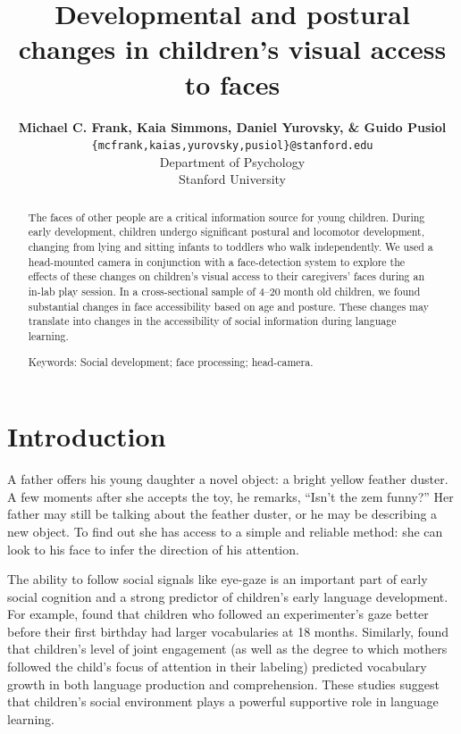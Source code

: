 \documentclass[10pt,letterpaper]{article}
\title{Developmental and postural changes in children's visual access to faces}
\author{{\large \bf Michael C. Frank, Kaia Simmons, Daniel Yurovsky, \& Guido Pusiol} \\
\texttt{\{mcfrank,kaias,yurovsky,pusiol\}@stanford.edu} \\
Department of Psychology \\
Stanford University}
\begin{document}
\maketitle

\begin{abstract} 

The faces of other people are a critical information source for young children. During early development, children undergo significant postural and locomotor development, changing from lying and sitting infants to toddlers who walk independently. We used a head-mounted camera in conjunction with a face-detection system to explore the effects of these changes on children's visual access to their caregivers' faces during an in-lab play session. In a cross-sectional sample of 4--20 month old children, we found substantial changes in face accessibility based on age and posture. These changes may translate into changes in the accessibility of social information during language learning. 

{Keywords:} Social development; face processing; head-camera.
\end{abstract}

\section{Introduction}

A father offers his young daughter a novel object: a bright yellow feather duster. A few moments after she accepts the toy, he remarks, ``Isn't the zem funny?'' Her father may still be talking about the feather duster, or he may be describing a new object.  To find out she has access to a simple and reliable method: she can look to his face to infer the direction of his attention. 

The ability to follow social signals like eye-gaze is an important part of early social cognition \cite{scaife1975} and a strong predictor of children's early language development. For example,  found that children who followed an experimenter's gaze better before their first birthday had larger vocabularies at 18 months. Similarly,  found that children's level of joint engagement (as well as the degree to which mothers followed the child's focus of attention in their labeling) predicted vocabulary growth in both language production and comprehension. These studies suggest that children's social environment plays a powerful supportive role in language learning. 
\end{document}

